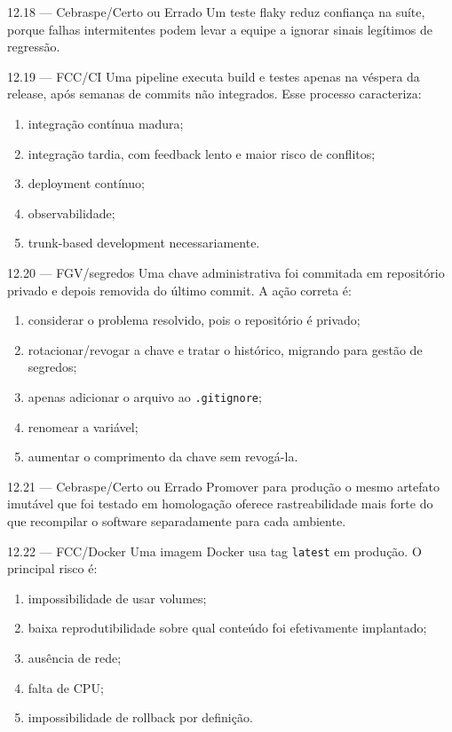 \begin{questao}{ 12.18 — Cebraspe/Certo ou Errado}
Um teste flaky reduz confiança na suíte, porque falhas intermitentes podem levar a equipe a ignorar sinais legítimos de regressão.
\end{questao}

\begin{questao}{ 12.19 — FCC/CI}
Uma pipeline executa build e testes apenas na véspera da release, após semanas de commits não integrados. Esse processo caracteriza:
\begin{enumerate}[label=\Alph*)]
\item integração contínua madura;
\item integração tardia, com feedback lento e maior risco de conflitos;
\item deployment contínuo;
\item observabilidade;
\item trunk-based development necessariamente.
\end{enumerate}
\end{questao}

\begin{questao}{ 12.20 — FGV/segredos}
Uma chave administrativa foi commitada em repositório privado e depois removida do último commit. A ação correta é:
\begin{enumerate}[label=\Alph*)]
\item considerar o problema resolvido, pois o repositório é privado;
\item rotacionar/revogar a chave e tratar o histórico, migrando para gestão de segredos;
\item apenas adicionar o arquivo ao \texttt{.gitignore};
\item renomear a variável;
\item aumentar o comprimento da chave sem revogá-la.
\end{enumerate}
\end{questao}

\begin{questao}{ 12.21 — Cebraspe/Certo ou Errado}
Promover para produção o mesmo artefato imutável que foi testado em homologação oferece rastreabilidade mais forte do que recompilar o software separadamente para cada ambiente.
\end{questao}

\begin{questao}{ 12.22 — FCC/Docker}
Uma imagem Docker usa tag \texttt{latest} em produção. O principal risco é:
\begin{enumerate}[label=\Alph*)]
\item impossibilidade de usar volumes;
\item baixa reprodutibilidade sobre qual conteúdo foi efetivamente implantado;
\item ausência de rede;
\item falta de CPU;
\item impossibilidade de rollback por definição.
\end{enumerate}
\end{questao}


